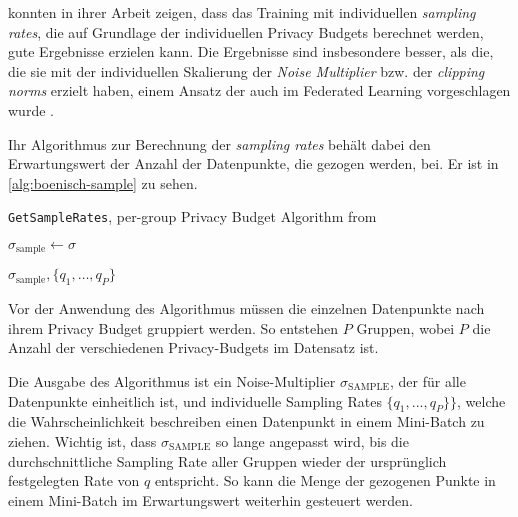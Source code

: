 \textcite{boenisch:2023} konnten in ihrer Arbeit zeigen, dass das Training mit individuellen \textit{sampling rates}, die auf Grundlage der individuellen Privacy Budgets berechnet werden, gute Ergebnisse erzielen kann. Die Ergebnisse sind insbesondere besser, als die, die sie mit der individuellen Skalierung der \textit{Noise Multiplier} bzw. der \textit{clipping norms} erzielt haben, einem Ansatz der auch im Federated Learning vorgeschlagen wurde \cite{aldaghri:2023}. 

Ihr Algorithmus zur Berechnung der \textit{sampling rates} behält dabei den Erwartungswert der Anzahl der Datenpunkte, die gezogen werden, bei. Er ist in \autoref{alg:boenisch-sample} zu sehen.

\begin{algorithm}[tb]
	\caption{\texttt{GetSampleRates}, per-group Privacy Budget Algorithm from \cite[p.6]{boenisch:2023}}
	\label{alg:boenisch-sample}
	
	
	\BlankLine
	$\sigma_\text{sample} \leftarrow \sigma$
	
	\KwRet $\sigma_\text{sample}, \{q_1, \dots, q_P\}$\;
\end{algorithm}

Vor der Anwendung des Algorithmus müssen die einzelnen Datenpunkte nach ihrem Privacy Budget gruppiert werden. So entstehen $P$ Gruppen, wobei $P$ die Anzahl der verschiedenen Privacy-Budgets im Datensatz ist.

Die Ausgabe des Algorithmus ist ein Noise-Multiplier $\sigma_{\text{SAMPLE}}$, der für alle Datenpunkte einheitlich ist, und individuelle Sampling Rates $\{q_1, ..., q_P\}\}$, welche die Wahrscheinlichkeit beschreiben einen Datenpunkt in einem Mini-Batch zu ziehen. Wichtig ist, dass $\sigma_{\text{SAMPLE}}$ so lange angepasst wird, bis die durchschnittliche Sampling Rate aller Gruppen wieder der ursprünglich festgelegten Rate von $q$ entspricht. So kann die Menge der gezogenen Punkte in einem Mini-Batch im Erwartungswert weiterhin gesteuert werden.


